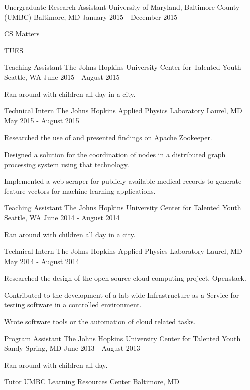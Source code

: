 \begin{cventries}
\cventry
{Unergraduate Research Assistant}
{University of Maryland, Baltimore County (UMBC)}
{Baltimore, MD}
{January 2015 - December 2015}
{
\begin{cvitems}
\item{CS Matters}
\item{TUES}
\end{cvitems}
}
\cventry
{Teaching Assistant}
{The Johns Hopkins University Center for Talented Youth}
{Seattle, WA}
{June 2015 - August 2015}
{
    \begin{cvitems}
        \item{Ran around with children all day in a city.}
    \end{cvitems}
}

\cventry
{Technical Intern}
{The Johns Hopkins Applied Physics Laboratory}
{Laurel, MD}
{May 2015 - August 2015}
{
    \begin{cvitems}
        \item{Researched the use of and presented findings on Apache Zookeeper.}
        \item{Designed a solution for the coordination of nodes in a distributed graph processing system using that technology.}
        \item{Implemented a web scraper for publicly available medical records to generate feature vectors for machine learning applications.}
    \end{cvitems}
}

\cventry
{Teaching Assistant}
{The Johns Hopkins University Center for Talented Youth}
{Seattle, WA}
{June 2014 - August 2014}
{
    \begin{cvitems}
        \item{Ran around with children all day in a city.}
    \end{cvitems}
}


\cventry
{Technical Intern}
{The Johns Hopkins Applied Physics Laboratory}
{Laurel, MD}
{May 2014 - August 2014}
{
    \begin{cvitems}
        \item{Researched the design of the open source cloud computing project, Openstack.}
        \item{Contributed to the development of a lab-wide Infrastructure as a Service for testing software in a controlled environment.}
        \item{Wrote software tools or the automation of cloud related tasks.}
    \end{cvitems}
}

\cventry
{Program Assistant}
{The Johns Hopkins University Center for Talented Youth}
{Sandy Spring, MD}
{June 2013 - August 2013}
{
    \begin{cvitems}
        \item{Ran around with children all day.}
    \end{cvitems}
}

\cventry
{Tutor}
{UMBC Learning Resources Center}
{Baltimore, MD}
{}
{}

\end{cventries}
